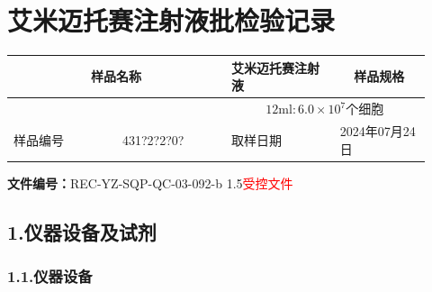 \documentclass[UTF8,10pt,a4paper,fontset=fandol]{ctexart}
\newcommand{\fieldvalue}[1]{#1}
\newcommand{\handwritten}[1]{#1}
\begin{document}
\newpage

\section*{艾米迈托赛注射液批检验记录}

\noindent
\begin{tabular}{|p{0.24\linewidth}|p{0.24\linewidth}|p{0.24\linewidth}|p{0.20\linewidth}|}
\hline
\multicolumn{2}{|c|}{样品名称} & 艾米迈托赛注射液 & \multicolumn{1}{c|}{样品规格} \\ \hline
\multicolumn{2}{|c|}{} & \multicolumn{2}{c|}{$12\mathrm{ml}:6.0\times10^{7}$个细胞} \\ \hline
样品编号 &
\fieldvalue{\handwritten{431?2?2?0?}} &
取样日期 &
\fieldvalue{\handwritten{2024年07月24日}} \\ \hline
\end{tabular}

\noindent
\textbf{文件编号：}REC-YZ-SQP-QC-03-092-b\quad
\fieldvalue{1.5}\quad \textcolor{red}{受控文件}

\subsection*{1.\quad 仪器设备及试剂}

\subsubsection*{1.1.\quad 仪器设备}
\end{document}
